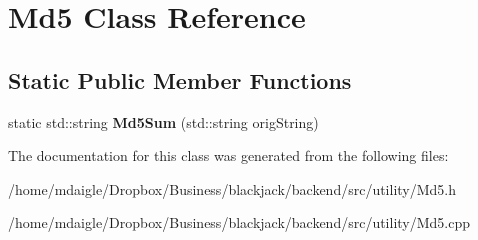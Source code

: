 \hypertarget{classMd5}{
\section{\-Md5 \-Class \-Reference}
\label{db/d34/classMd5}
}
\subsection*{\-Static \-Public \-Member \-Functions}
\begin{DoxyCompactItemize}
\item 
\hypertarget{classMd5_a00168b527258bd57303819b74795f482}{
static std\-::string {\bfseries \-Md5\-Sum} (std\-::string orig\-String)}
\label{db/d34/classMd5_a00168b527258bd57303819b74795f482}

\end{DoxyCompactItemize}


\-The documentation for this class was generated from the following files\-:\begin{DoxyCompactItemize}
\item 
/home/mdaigle/\-Dropbox/\-Business/blackjack/backend/src/utility/\-Md5.\-h\item 
/home/mdaigle/\-Dropbox/\-Business/blackjack/backend/src/utility/\-Md5.\-cpp\end{DoxyCompactItemize}
